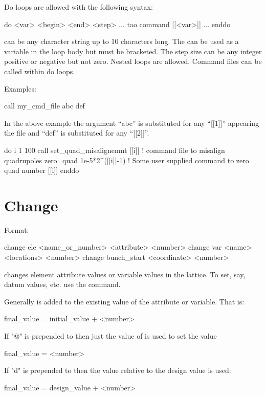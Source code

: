 Do loops are allowed with the following syntax:
\begin{example}
  do <var> <begin> <end> <step> 
    ...
    tao command [[<var>]]
    ...
  enddo
\end{example}
 can be any character string up to 10 characters long.
The  can be used as a variable in the loop body but must be
bracketed.  The step size can be any integer positive or negative but not zero.
Nested loops are allowed. Command files can be called within do loops.

Examples:
\begin{example}
    call my_cmd_file abc def 
\end{example}
In the above example the argument ``abc'' is substituted for any
``[[1]]'' appearing the file and ``def'' is substituted for any
``[[2]]''.
\Newline

\begin{example}
  do i 1 100
    call set_quad_misalignemnt [[i]] ! command file to misalign quadrupoles
    zero_quad 1e-5*2^([[i]]-1) ! Some user supplied command to zero quad number [[i]]
  enddo
\end{example}

\section{Change}
\label{s:change}

Format:
\begin{example}
  change ele <name_or_number> <attribute> <number>
  change var <name> <locations> <number>
  change bunch_start <coordinate> <number>
\end{example}

\vskip 0.2in  changes element attribute values or variable
values in the  lattice. To set, say, datum values, etc. use
the  command.

Generally  is added to the existing value of the
attribute or variable. That is:
\begin{example}
  final_value = initial_value + <number>
\end{example}
If "@" is prepended to  then just the value of
 is used to set the value
\begin{example}
  final_value = <number>
\end{example}
If "d" is prepended to  then the value relative to the design
value is used:
\begin{example}
  final_value = design_value + <number>
\end{example}

